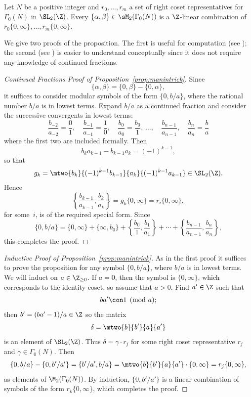 \begin{proposition}[Manin]\label{prop:manintrick}
Let $N$ be a positive integer and $r_0,\ldots, r_m$
a set of right coset representatives for $\Gamma_0(N)$ in 
$\SL_2(\Z)$.
Every $\{\alpha, \beta\} \in \sM_2(\Gamma_0(N))$
is a $\Z$-linear combination of 
$r_0\{0,\infty\}, \ldots, r_m\{0,\infty\}$.
\end{proposition}
We give two proofs of the proposition.  The first is useful for
computation (see \cite[\S2.1.6]{cremona:algs}); the second (see
\cite[\S2]{mtt}) is easier to understand conceptually since it does
not require any knowledge of continued fractions.
\begin{proof}[Continued Fractions Proof of Proposition~\ref{prop:manintrick}]
Since $$\{\alpha,\beta\}=\{0,\beta\}-\{0,\alpha\},$$
it suffices to consider modular symbols of the form $\{0,b/a\}$, where
the rational number $b/a$ is in lowest terms.  Expand $b/a$ as a
continued fraction and consider the successive convergents in lowest
terms:
$$
\frac{b_{-2}}{a_{-2}} = \frac{0}{1},\quad
\frac{b_{-1}}{a_{-1}} = \frac{1}{0},\quad
\frac{b_0}{a_0} = \frac{b_0}{1},\,
\ldots,\quad
\frac{b_{n-1}}{a_{n-1}},\quad
\frac{b_n}{a_n}= \frac{b}{a}
$$
where the first two are included formally.
Then
$$b_k a_{k-1} - b_{k-1} a_k = (-1)^{k-1},$$
so that
$$g_k = \mtwo{b_k}{\hfill (-1)^{k-1}b_{k-1}}{a_k}{(-1)^{k-1}a_{k-1}}\in \SL_2(\Z).$$
Hence
$$\left\{\frac{b_{k-1}}{a_{k-1}}, \frac{b_k}{a_k}\right\} 
  = g_k \{ 0, \infty\} = r_i \{0,\infty\},$$
for some~$i$, is of the required special form. 
Since
$$
\{0,b/a\} = \{0,\infty\} + \{\infty,b_0\} + \left\{\frac{b_0}{1}, \frac{b_1}{a_1}\right\}
   + \cdots + \left\{\frac{b_{n-1}}{a_{n-1}}, \frac{b_n}{a_n}\right\},
$$
this completes the proof.
\end{proof}
\begin{proof}[Inductive Proof of Proposition~\ref{prop:manintrick}]
As in the first proof it suffices to prove the proposition
for any symbol $\{0,b/a\}$, where $b/a$ is in lowest terms.
We will induct on $a\in\Z_{\geq 0}$.  If $a=0$, then the symbol
is $\{0,\infty\}$, which corresponds to the identity coset,
so assume that $a>0$.  Find $a'\in\Z$ such that 
$$
  ba'\con 1\pmod{a};
$$
then
$
  b' = (b a' - 1)/a \in\Z
$
so the matrix
$$ 
  \delta = \mtwo{b}{b'}{a}{a'}
$$
is an element of $\SL_2(\Z)$.  Thus
 $\delta = \gamma \cdot r_j$ for some right coset representative $r_j$
and $\gamma \in \Gamma_0(N)$.  Then
$$
   \{0, b/a\} - \{0, b'/a'\} = 
    \{b'/a', b/a\} = \mtwo{b}{b'}{a}{a'}\cdot \{0,\infty\} = r_j \{0,\infty\},
$$
as elements of $\M_2(\Gamma_0(N))$.
By induction, $\{0, b'/a'\}$ is a linear combination of symbols of the
form $r_k\{0,\infty\}$, which completes the proof.
\end{proof}

